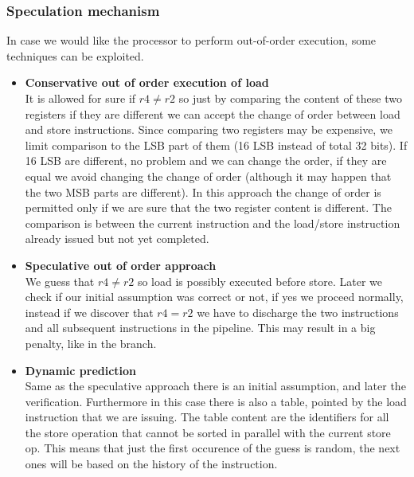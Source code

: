 \subsubsection{Speculation mechanism}
In case we would like the processor to perform out-of-order execution, some
techniques can be exploited.
\begin{itemize}
  \item \textbf{Conservative out of order execution of load}\\
  It is allowed for sure if $r4 \neq r2$ so just by comparing the content of
  these two registers if they are different we can accept the change of order
  between load and store instructions.  Since comparing two registers may be
  expensive, we limit comparison to the LSB part of them (16 LSB instead of
  total 32 bits). If 16 LSB are different, no problem and we can change the
  order, if they are equal we avoid changing the change of order (although it
  may happen that the two MSB parts are different). In this approach the change
  of order is permitted only if we are sure that the two register content is
  different. The comparison is between the current instruction and the
  load/store instruction already issued but not yet completed.
  \item \textbf{Speculative out of order approach}\\
  We guess that $r4 \neq r2$ so load is possibly executed before store. Later
  we check if our initial assumption was correct or not, if yes we proceed
  normally, instead if we discover that $r4=r2$ we have to discharge the two
  instructions and all subsequent instructions in the pipeline. This may result
  in a big penalty, like in the branch.
  \item \textbf{Dynamic prediction}\\
  Same as the speculative approach there is an initial assumption, and later
  the verification. Furthermore in this case there is also a table, pointed by
  the load instruction that we are issuing. The table content are the
  identifiers for all the store operation that cannot be sorted in parallel
  with the current store op. This means that just the first occurence of the
  guess is random, the next ones will be based on the history of the instruction.
\end{itemize}
